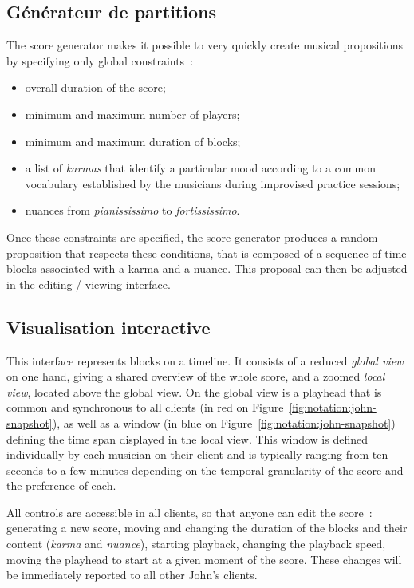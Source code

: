 \subsection{Générateur de partitions}

The score generator makes it possible to very quickly create musical propositions by specifying only global constraints :
\begin{itemize}
\item overall duration of the score;
\item minimum and maximum number of players;
\item minimum and maximum duration of blocks;
\item a list of \textit{karmas} that identify a particular mood according to a common vocabulary established by the musicians during improvised practice sessions;
\item nuances from \textit{pianississimo} to \textit{fortississimo}.
\end{itemize}

Once these constraints are specified, the score generator produces a random proposition that respects these conditions, that is composed of a sequence of time blocks associated with a karma and a nuance. This proposal can then be adjusted in the editing / viewing interface.

\subsection{Visualisation interactive}

This interface represents blocks on a timeline. It consists of a reduced \textit{global view} on one hand, giving a shared overview of the whole score, and a zoomed \textit{local view}, located above the global view. On the global view is a playhead that is common and synchronous to all clients (in red on Figure \ref{fig:notation:john-snapshot}), as well as a window (in blue on Figure \ref{fig:notation:john-snapshot}) defining the time span displayed in the local view. This window is defined individually by each musician on their client and is typically ranging from ten seconds to a few minutes depending on the temporal granularity of the score and the preference of each.

All controls are accessible in all clients, so that anyone can edit the score : generating a new score, moving and changing the duration of the blocks and their content (\textit{karma} and \textit{nuance}), starting playback, changing the playback speed, moving the playhead to start at a given moment of the score. These changes will be immediately reported to all other John's clients.

